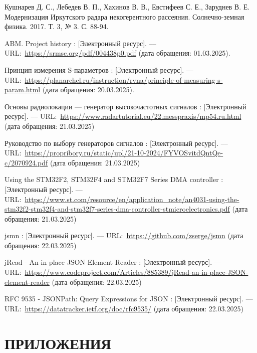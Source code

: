\documentclass{report}
\begin{document}
\begin{thebibliography}{}

 Кушнарев Д. С., Лебедев В. П., Хахинов В. В., Евстифеев С. Е., Заруднев В. Е. Модернизация Иркутского радара некогерентного рассеяния. Солнечно-земная физика. 2017. Т. 3, № 3. С. 88-94.

 ABM. Project history : [Электронный ресурс]. --– URL:~\url{https://srmsc.org/pdf/004438p0.pdf} (дата обращения: 01.03.2025).

 Принцип измерения S-параметров : [Электронный ресурс]. --– URL:~\url{https://planarchel.ru/instruction/rvna/principle-of-measuring-s-param.html} (дата обращения: 20.03.2025).

 Основы радиолокации --- генератор высокочастотных сигналов : [Электронный ресурс]. --– URL:~\url{https://www.radartutorial.eu/22.messpraxis/mp54.ru.html} (дата обращения: 21.03.2025)

 Руководство по выбору генераторов сигналов : [Электронный ресурс]. --– URL:~\url{https://propribory.ru/static/upl/21-10-2024/FYVOSvitdQntQe-c/2070924.pdf} (дата обращения: 21.03.2025)

 Using the STM32F2, STM32F4 and STM32F7 Series DMA controller : [Электронный ресурс]. --– URL:~\url{https://www.st.com/resource/en/application_note/an4031-using-the-stm32f2-stm32f4-and-stm32f7-series-dma-controller-stmicroelectronics.pdf} (дата обращения: 21.03.2025)

 jsmn : [Электронный ресурс]. --– URL:~\url{https://github.com/zserge/jsmn} (дата обращения: 22.03.2025)

 jRead - An in-place JSON Element Reader : [Электронный ресурс]. --– URL:~\url{https://www.codeproject.com/Articles/885389/jRead-an-in-place-JSON-element-reader} (дата обращения: 22.03.2025)

 RFC 9535 - JSONPath: Query Expressions for JSON : [Электронный ресурс]. --– URL:~\url{https://datatracker.ietf.org/doc/rfc9535/} (дата обращения: 22.03.2025)

\end{thebibliography}


\chapter*{ПРИЛОЖЕНИЯ}

\end{document}
